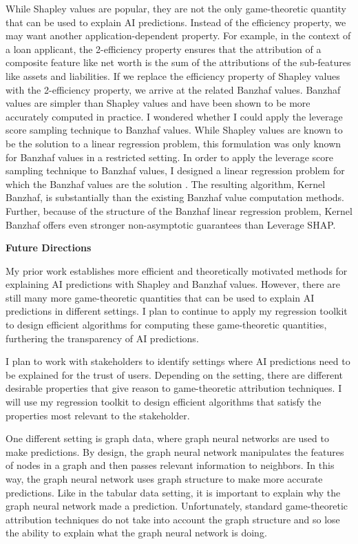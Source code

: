 \documentclass[11pt]{article}
\begin{document}
{While Shapley values are popular, they are not the only game-theoretic quantity that can be used to explain AI predictions.
Instead of the efficiency property, we may want another application-dependent property.
For example, in the context of a loan applicant, the 2-efficiency property ensures that the attribution of a composite feature like net worth is the sum of the attributions of the sub-features like assets and liabilities.
If we replace the efficiency property of Shapley values with the 2-efficiency property, we arrive at the related Banzhaf values.
Banzhaf values are simpler than Shapley values and have been shown to be more accurately computed in practice.
I wondered whether I could apply the leverage score sampling technique to Banzhaf values.
While Shapley values are known to be the solution to a linear regression problem, this formulation was only known for Banzhaf values in a restricted setting.
In order to apply the leverage score sampling technique to Banzhaf values, I designed a linear regression problem for which the Banzhaf values are the solution \cite{liu2024kernel}.
The resulting algorithm, Kernel Banzhaf, is substantially than the existing Banzhaf value computation methods.
Further, because of the structure of the Banzhaf linear regression problem, Kernel Banzhaf offers even stronger non-asymptotic guarantees than Leverage SHAP.

{ \large \textbf{Future Directions}}

My prior work establishes more efficient and theoretically motivated methods for explaining AI predictions with Shapley and Banzhaf values.
However, there are still many more game-theoretic quantities that can be used to explain AI predictions in different settings.
I plan to continue to apply my regression toolkit to design efficient algorithms for computing these game-theoretic quantities, furthering the transparency of AI predictions.

I plan to work with stakeholders to identify settings where AI predictions need to be explained for the trust of users.
Depending on the setting, there are different desirable properties that give reason to game-theoretic attribution techniques.
I will use my regression toolkit to design efficient algorithms that satisfy the properties most relevant to the stakeholder.

One different setting is graph data, where graph neural networks are used to make predictions.
By design, the graph neural network manipulates the features of nodes in a graph and then passes relevant information to neighbors.
In this way, the graph neural network uses graph structure to make more accurate predictions.
Like in the tabular data setting, it is important to explain why the graph neural network made a prediction.
Unfortunately, standard game-theoretic attribution techniques do not take into account the graph structure and so lose the ability to explain what the graph neural network is doing.

}
\end{document}
